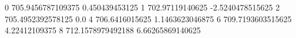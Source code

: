 0 705.9456787109375 0.450439453125
1 702.97119140625 -2.5240478515625
2 705.4952392578125 0.0
4 706.6416015625 1.1463623046875
6 709.7193603515625 4.22412109375
8 712.1578979492188 6.66265869140625
